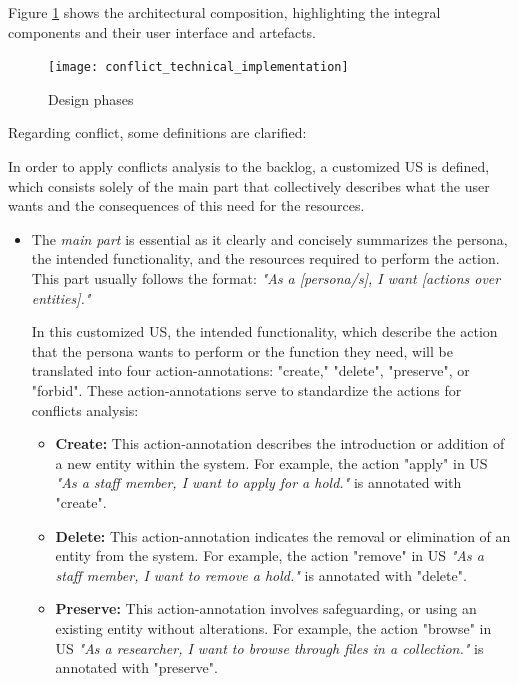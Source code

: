 Figure \ref{fig:conflict_technical_implementation} shows the architectural composition, highlighting the integral components and their user interface and artefacts.
\begin{figure}[h]
	\centering 
	\texttt{[image: conflict\_technical\_implementation]}
	\caption{Design phases}\label{fig:conflict_technical_implementation}
\end{figure}

Regarding conflict, some definitions are clarified:
\begin{definition}
	In order to apply conflicts analysis to the backlog, a customized US is defined, which consists solely of the main part that collectively describes what the user wants and the consequences of this need for the resources.
\begin{itemize}
	\item The \textit{main part} is essential as it clearly and concisely summarizes the persona, the intended functionality, and the resources required to perform the action. This part usually follows the format: \textit{"As a [persona/s], I want [actions over entities]."}
	
	In this customized US, the intended functionality, which describe the action that the persona wants to perform or the function they need, will be translated into four action-annotations: "create," "delete", "preserve", or "forbid". These action-annotations serve to standardize the actions for conflicts analysis:
	
	\begin{itemize}
		\item \textbf{Create:} This action-annotation describes the introduction or addition of a new entity within the system. For example, the action "apply" in US \textit{"As a staff member, I want to apply for a hold."} is annotated with "create".
		
		\item \textbf{Delete:} This action-annotation indicates the removal or elimination of an entity from the system. For example, the action "remove" in US \textit{"As a staff member, I want to remove a hold."} is annotated with "delete".
		
		\item \textbf{Preserve:} This action-annotation involves safeguarding, or using an existing entity without alterations. For example, the action "browse" in US \textit{"As a researcher, I want to browse through files in a collection."} is annotated with "preserve".
		

\end{itemize}
\end{itemize}
\end{definition}
